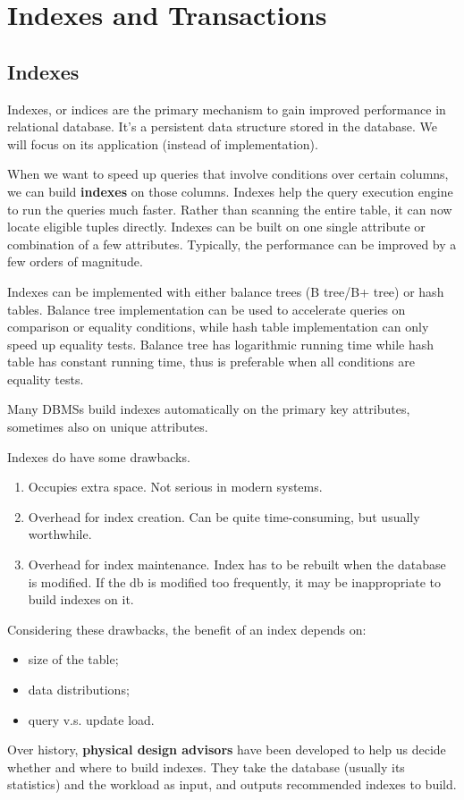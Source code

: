 \ifx\PREAMBLE\undefined


\fi
\chapter{Indexes and Transactions}
\section{Indexes}
Indexes, or indices are the primary mechanism to gain improved performance in relational database. It's a persistent data structure stored in the database. We will focus on its application (instead of implementation).

When we want to speed up queries that involve conditions over certain columns, we can build \textbf{indexes} on those columns. Indexes help the query execution engine to run the queries much faster. Rather than scanning the entire table, it can now locate eligible tuples directly. Indexes can be built on one single attribute or combination of a few attributes. Typically, the performance can be improved by a few orders of magnitude. 

Indexes can be implemented with either balance trees (B tree/B+ tree) or hash tables. Balance tree implementation can be used to accelerate queries on comparison or equality conditions, while hash table implementation can only speed up equality tests. Balance tree has logarithmic running time while hash table has constant running time, thus is preferable when all conditions are equality tests. 

Many DBMSs build indexes automatically on the primary key attributes, sometimes also on unique attributes. 

Indexes do have some drawbacks. 
\begin{enumerate}
\item Occupies extra space. Not serious in modern systems.
\item Overhead for index creation. Can be quite time-consuming, but usually worthwhile.
\item Overhead for index maintenance. Index has to be rebuilt when the database is modified. If the db is modified too frequently, it may be inappropriate to build indexes on it. 
\end{enumerate}
Considering these drawbacks, the benefit of an index depends on:
\begin{itemize}
\item size of the table;
\item data distributions;
\item query v.s. update load.
\end{itemize}
Over history, \textbf{physical design advisors} have been developed to help us decide whether and where to build indexes. They take the database (usually its statistics) and the workload as input, and outputs recommended indexes to build. 


